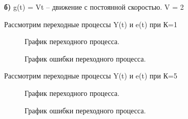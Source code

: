 \documentclass[a4paper, 11pt]{article}
\begin{document}
\newpage

\normalsize{\textbf{б)} g(t) = Vt – движение с постоянной скоростью. V = 2

Рассмотрим переходные процессы Y(t) и e(t) при К=1}

\begin{figure}[h]
    \caption{График переходного процесса.}
    \label{four}
\end{figure}
\begin{figure}[h]
    \caption{График ошибки переходного процесса.}
    \label{tree}
\end{figure}

\normalsize{Рассмотрим переходные процессы Y(t) и e(t) при К=5}

\begin{figure}[h]
    \caption{График переходного процесса.}
    \label{four}
\end{figure}

\newpage

\begin{figure}[h]
    \caption{График ошибки переходного процесса.}
    \label{tree}
\end{figure}
\end{document}
